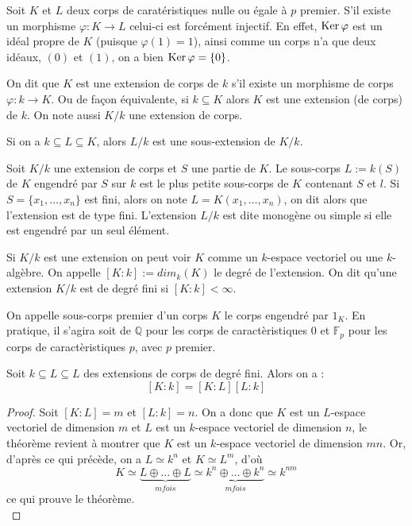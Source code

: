 \documentclass[a4paper]{article} %
\numberwithin{equation}{section}
\begin{document}
Soit $K$ et $L$ deux corps de caratéristiques nulle ou égale à $p$ premier. S'il existe un morphisme $\varphi : K \to L$ celui-ci est forcément injectif. En effet, $\textup{Ker}\,\varphi$ est un idéal propre de $K$ (puisque $\varphi(1) = 1$), ainsi comme un corps n'a que deux idéaux, $(0)$ et $(1)$, on a bien $\textup{Ker}\,\varphi = \lbrace0\rbrace$.

\begin{defn}
On dit que $K$ est une extension de corps de $k$ s'il existe un morphisme de corps $\varphi : k \to K$. Ou de façon équivalente, si $k \subseteq K$ alors $K$ est une extension (de corps) de $k$. On note aussi $K/k$ une extension de corps.\par
Si on a $k\subseteq L \subseteq K$, alors $L/k$ est une sous-extension de $K/k$.
\end{defn}

\begin{defn}
Soit $K/k$ une extension de corps et $S$ une partie de $K$. Le sous-corps $L := k(S)$ de $K$ engendré par $S$ sur $k$ est le plus petite sous-corps de $K$ contenant $S$ et $l$. Si $S = \lbrace x_1,\dots,x_n \rbrace$ est fini, alors on note $L = K(x_1,\dots,x_n)$, on dit alors que l'extension est de type fini. L'extension $L/k$ est dite monogène ou simple si elle est engendré par un seul élément.\par
Si $K/k$ est une extension on peut voir $K$ comme un $k$-espace vectoriel ou une $k$-algèbre. On appelle $[K:k] := dim_k(K)$ le degré de l'extension. On dit qu'une extension $K/k$ est de degré fini si $[K:k] < \infty$.\par
On appelle sous-corps premier d'un corps $K$ le corps engendré par $1_{K}$. En pratique, il s'agira soit de $\mathbb{Q}$ pour les corps de caractèristiques $0$ et $\mathbb{F}_p$ pour les corps de caractèristiques $p$, avec $p$ premier.
\end{defn}

\begin{thm}
Soit $k \subseteq L \subseteq L$ des extensions de corps de degré fini. Alors on a :
\[[K:k] = [K:L][L:k]\]
\end{thm}
\begin{proof}
Soit $[K:L] = m$ et $[L:k] = n$. On a donc que $K$ est un $L$-espace vectoriel de dimension $m$ et $L$ est un $k$-espace vectoriel de dimension $n$, le théorème revient à montrer que $K$ est un $k$-espace vectoriel de dimension $mn$. Or, d'après ce qui précède, on a $L \simeq k^n$ et $K \simeq L^m$, d'où
\[K \simeq \underbrace{L \oplus\dots\oplus L}_{m fois}\simeq\underbrace{k^n\oplus\dots\oplus k^n}_{m fois} \simeq k^{nm}\]
ce qui prouve le théorème.\\
\end{proof}
\end{document}
